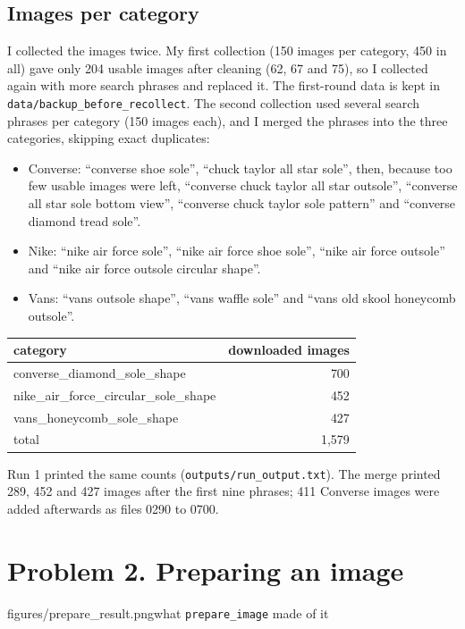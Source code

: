 \documentclass[11pt]{article}
\begin{document}
\subsection*{Images per category}
I collected the images twice. My first collection (150 images per category, 450 in all) gave only 204 usable images after cleaning (62, 67 and 75), so I collected again with more search phrases and replaced it. The first-round data is kept in \texttt{data/backup\_before\_recollect}. The second collection used several search phrases per category (150 images each), and I merged the phrases into the three categories, skipping exact duplicates:
\begin{itemize}
  \item Converse: ``converse shoe sole'', ``chuck taylor all star sole'', then, because too few usable images were left, ``converse chuck taylor all star outsole'', ``converse all star sole bottom view'', ``converse chuck taylor sole pattern'' and ``converse diamond tread sole''.
  \item Nike: ``nike air force sole'', ``nike air force shoe sole'', ``nike air force outsole'' and ``nike air force outsole circular shape''.
  \item Vans: ``vans outsole shape'', ``vans waffle sole'' and ``vans old skool honeycomb outsole''.
\end{itemize}
\begin{center}\small
\begin{tabular}{lr}
\toprule
category & downloaded images \\
\midrule
converse\_diamond\_sole\_shape & 700 \\
nike\_air\_force\_circular\_sole\_shape & 452 \\
vans\_honeycomb\_sole\_shape & 427 \\
\midrule
total & 1,579 \\
\bottomrule
\end{tabular}
\end{center}
Run 1 printed the same counts (\texttt{outputs/run\_output.txt}). The merge printed 289, 452 and 427 images after the first nine phrases; 411 Converse images were added afterwards as files 0290 to 0700.

\section*{Problem 2. Preparing an image}
           {figures/prepare_result.png}{what \texttt{prepare\_image} made of it}
\end{document}
